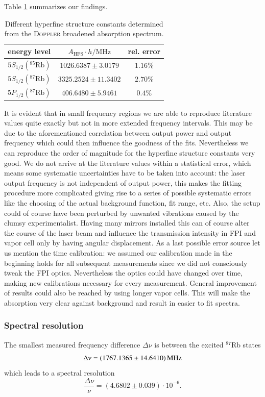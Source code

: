 \documentclass[11pt,a4paper,notitlepage]{scrartcl}
\begin{document}
 Table \ref{tab:hfs} summarizes our findings.
 \begin{table}[htbp]
 	\centering
 	\begin{tabular}{c|c|c}
 		\toprule
 		energy level & $A_\text{HFS} \cdot h / \si{\mega \Hz} $ & rel. error \\
 		\hline
 		$5S_{1/2}(^{85}\text{Rb})$& $ 1026.6387\pm3.0179$& $1.16\%$\\
 		$5S_{1/2}(^{87}\text{Rb})$& $ 3325.2524\pm11.3402$& $2.70\%$\\
 		$5P_{1/2}(^{87}\text{Rb})$& $ 406.6480\pm5.9461$& $0.4\%$\\
 		\bottomrule
 	\end{tabular}
 \caption{Different hyperfine structure constants determined from the \textsc{Doppler} broadened absorption spectrum.}
\label{tab:hfs} 
\end{table}
 
 It is evident that in small frequency regions we are able to reproduce literature values quite exactly but not in more extended frequency intervals. This may be due to the aforementioned correlation between output power and output frequency which could then influence the goodness of the fits. Nevertheless we can reproduce the order of magnitude for the hyperfine structure constants very good. We do not arrive at the literature values within a statistical error, which means some systematic uncertainties have to be taken into account: the laser output frequency is not independent of output power, this makes the fitting procedure more complicated giving rise to a series of possible systematic errors like the choosing of the actual background function, fit range, etc. Also, the setup could of course have been perturbed by unwanted vibrations caused by the clumsy experimentalist. Having many mirrors installed this can of course alter the course of the laser beam and influence the transmission intensity in FPI and vapor cell only by having angular displacement. As a last possible error source let us mention the time calibration: we assumed our calibration made in the beginning holds for all subsequent measurements since we did not consciously tweak the FPI optics. Nevertheless the optics could have changed over time, making new calibrations necessary for every measurement. General improvement of results could also be reached by using longer vapor cells. This will make the absorption very clear against background and result in easier to fit spectra.
\subsubsection{Spectral resolution}
The smallest measured frequency difference $\Delta\nu$ is between the excited $^{87}$Rb states $$\Delta\nu=\SI{1767.1365\pm14.6410}{\mega\Hz}$$ which leads to a spectral resolution $$\frac{\Delta \nu}{\nu}=(4.6802\pm0.039)\cdot10^{-6}.$$
\end{document}

